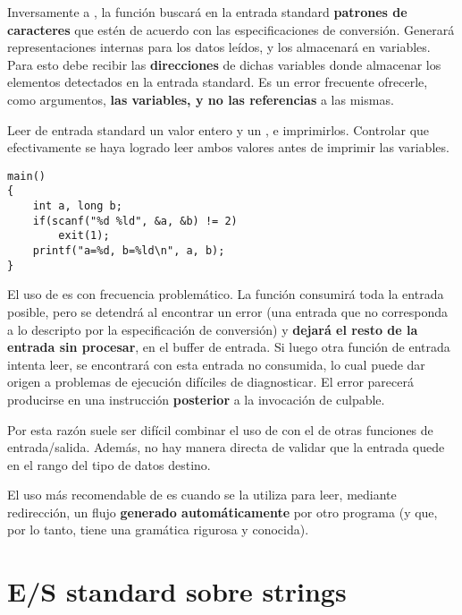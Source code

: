 Inversamente a , la función  buscará en la entrada standard
\textbf{patrones de caracteres} que estén de acuerdo con las especificaciones de conversión. Generará
representaciones internas para los datos leídos, y los almacenará en variables.
Para esto debe recibir las \textbf{direcciones} de dichas variables donde almacenar los
elementos detectados en la entrada standard. Es un error frecuente ofrecerle,
como argumentos, \textbf{las variables, y no las referencias} a las mismas.


\begin{ejemplo}
Leer de entrada standard un valor entero y un , e imprimirlos. Controlar que efectivamente se haya logrado leer ambos valores antes de imprimir las variables.
\begin{lstlisting}
main() 
{
    int a, long b;
    if(scanf("%d %ld", &a, &b) != 2)
        exit(1);
    printf("a=%d, b=%ld\n", a, b);
}
\end{lstlisting}
\end{ejemplo}


El uso de  es con frecuencia problemático. La función  consumirá
toda la entrada posible, pero se detendrá al encontrar un error (una entrada
que no corresponda a lo descripto por la especificación de conversión) y \textbf{dejará
el resto de la entrada sin procesar}, en el buffer de entrada. Si luego otra
función de entrada intenta leer, se encontrará con esta entrada no consumida,
lo cual puede dar origen a problemas de ejecución difíciles de diagnosticar. El
error parecerá producirse en una instrucción \textbf{posterior} a la invocación de  culpable. 

Por esta razón suele ser difícil combinar el uso de  con el de 
otras funciones de entrada/salida. Además, no hay manera directa de validar que
la entrada quede en el rango del tipo de datos destino.

El uso más recomendable de  es cuando se la utiliza para leer, mediante
redirección, un flujo \textbf{generado automáticamente} por otro programa (y que, por lo
tanto, tiene una gramática rigurosa y conocida).

\section{E/S standard sobre strings}
\label{subsec:esstandardstrings}

